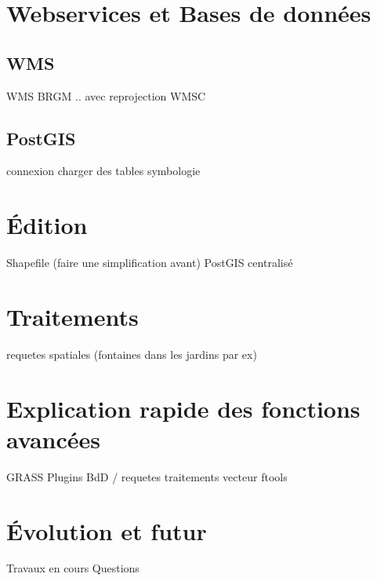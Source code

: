 
\section{Webservices et Bases de données}\label{sec:} 
\subsection{WMS}
WMS BRGM
        .. avec reprojection
        WMSC
\subsection{PostGIS}
            connexion
            charger des tables
            symbologie 
            
\section{Édition}\label{sec:} 
        Shapefile (faire une simplification avant)
        PostGIS centralisé 
\section{Traitements}\label{sec:} 
        requetes spatiales (fontaines dans les jardins par ex) 
\section{Explication rapide des fonctions avancées}\label{sec:} 
        GRASS
        Plugins
        BdD / requetes
        traitements vecteur ftools 
\section{Évolution et futur}\label{sec:} 
        Travaux en cours
        Questions 